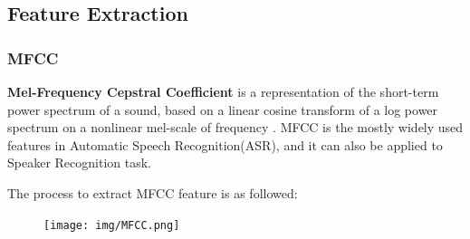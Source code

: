 
\subsection{Feature Extraction}


\subsubsection{MFCC}
\label{sec:mfcc}
\textbf{Mel-Frequency Cepstral Coefficient} is a representation of the short-term power spectrum of a sound,
based on a linear cosine transform of a log power spectrum on a nonlinear mel-scale of frequency \cite{mfcc} .
MFCC is the mostly widely used features in Automatic Speech Recognition(ASR), and it can also be applied to Speaker Recognition task.


The process to extract MFCC feature is as followed:
\begin{figure}[H]
  \centering
  \texttt{[image: img/MFCC.png]}
\end{figure}

